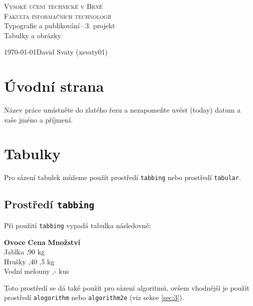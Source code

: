 \documentclass[a4paper,11pt, hidelinks]{article}
\begin{document}
\SetNlSkip{-1em}
\setlength{\unitlength}{1cm}

\begin{titlepage}
    \begin{center}
        {\Huge \textsc{Vysoké učení technické v Brně}\\[0.5em]}
        {\huge \textsc{Fakulta informačních technologií}\\}
        {\LARGE Typografie a publikování\,--\,3. projekt}\\[0.4em]
        {\Huge Tabulky a obrázky \\}
    \end{center}

    {\Large \today \hfill David Svaty (xsvaty01)}
\end{titlepage}

\label{page:1}

\section{Úvodní strana}
\label{sec:1}
Název práce umístněte do zlatého řezu a nezapomeňte uvést  (today) datum a vaše jméno a příjmení.

\section{Tabulky}
\label{sec:2}
Pro sázení tabulek můžeme použít prostředí \texttt{tabbing} nebo prostředí \texttt{tabular}.

\subsection{Prostředí \texttt{tabbing}}
Při použití \texttt{tabbing} vypadá tabulka následovně:
\begin{tabbing}
    \textbf{Ovoce} \hspace{16mm} \= \textbf{Cena} \hspace{4mm} \= \textbf{Množství} \\
    Jablka ,90  kg \\
    Hrušky ,40 ,5 kg \\
    Vodní melouny ,-  kus \\
\end{tabbing}
Toto prostředí se dá také použít pro sázení algoritmů, ovšem vhodnější je použít prostředí \texttt{alogorithm} nebo \texttt{algorithm2e} (viz sekce \ref*{sec:3}).
\end{document}

